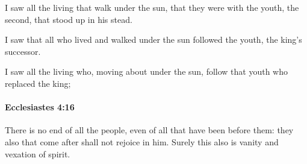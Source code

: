 			\begin{versebox}
					\item[BHS] 
					\item[LXX] 
					\item[ASV] I saw all the living that walk under the sun, that they were with the youth, the second, that stood up in his stead.
					\item[NIV] I saw that all who lived and walked under the sun followed the youth, the king’s successor.
					\item[NRSV] I saw all the living who, moving about under the sun, follow that youth who replaced the king;
			\end{versebox}

		\paragraph{Ecclesiastes 4:16} %
			\label{ECCLESIASTES-4-16}

			There is no end of all the people, even of all that have been before them: they also that come after shall not rejoice in him. Surely this also is vanity and vexation of spirit.

